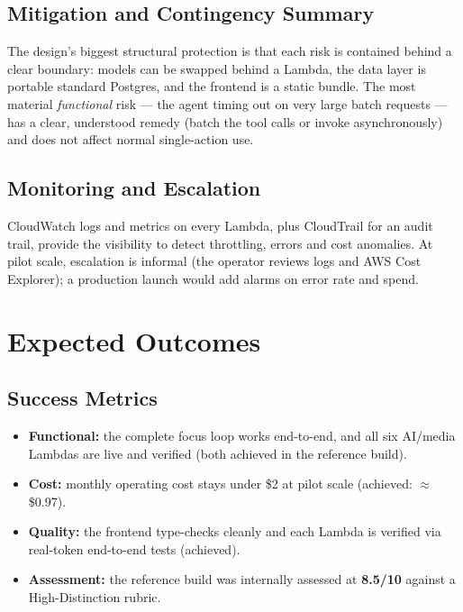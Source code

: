 \documentclass[a4paper,11pt]{article}
\begin{document}
	\subsection{Mitigation and Contingency Summary}
	The design's biggest structural protection is that each risk is contained behind a clear
	boundary: models can be swapped behind a Lambda, the data layer is portable standard
	Postgres, and the frontend is a static bundle. The most material \emph{functional} risk ---
	the agent timing out on very large batch requests --- has a clear, understood remedy (batch
	the tool calls or invoke asynchronously) and does not affect normal single-action use.

	\subsection{Monitoring and Escalation}
	CloudWatch logs and metrics on every Lambda, plus CloudTrail for an audit trail, provide the
	visibility to detect throttling, errors and cost anomalies. At pilot scale, escalation is
	informal (the operator reviews logs and AWS Cost Explorer); a production launch would add
	alarms on error rate and spend.

	\section{Expected Outcomes}

	\subsection{Success Metrics}
	\begin{itemize}
		\item \textbf{Functional:} the complete focus loop works end-to-end, and all six
		      AI/media Lambdas are live and verified (both achieved in the reference build).
		\item \textbf{Cost:} monthly operating cost stays under \$2 at pilot scale (achieved:
		      $\approx$\$0.97).
		\item \textbf{Quality:} the frontend type-checks cleanly and each Lambda is verified via
		      real-token end-to-end tests (achieved).
		\item \textbf{Assessment:} the reference build was internally assessed at \textbf{8.5/10}
		      against a High-Distinction rubric.
	\end{itemize}
\end{document}
